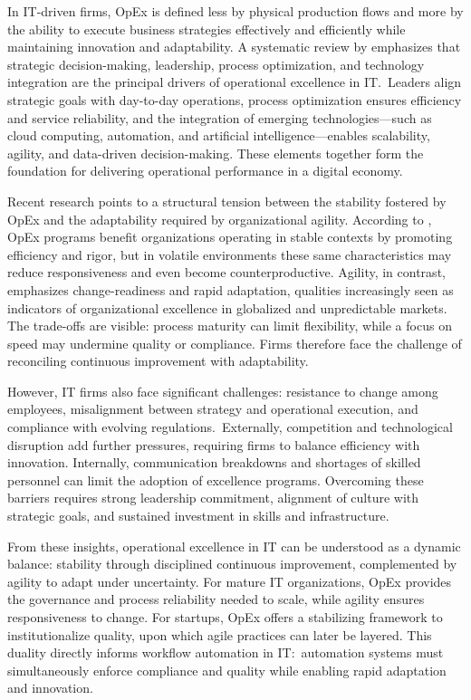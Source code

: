 In IT-driven firms, OpEx is defined less by physical production flows and more by the ability to execute business strategies effectively and efficiently while maintaining innovation and adaptability. A systematic review by \textcite{owoadeSystematic2024} emphasizes that strategic decision-making, leadership, process optimization, and technology integration are the principal drivers of operational excellence in IT.~Leaders align strategic goals with day-to-day operations, process optimization ensures efficiency and service reliability, and the integration of emerging technologies---such as cloud computing, automation, and artificial intelligence---enables scalability, agility, and data-driven decision-making. These elements together form the foundation for delivering operational performance in a digital economy.

Recent research points to a structural tension between the stability fostered by OpEx and the adaptability required by organizational agility. According to \textcite{carvalhoOperational2023}, OpEx programs benefit organizations operating in stable contexts by promoting efficiency and rigor, but in volatile environments these same characteristics may reduce responsiveness and even become counterproductive. Agility, in contrast, emphasizes change-readiness and rapid adaptation, qualities increasingly seen as indicators of organizational excellence in globalized and unpredictable markets. The trade-offs are visible: process maturity can limit flexibility, while a focus on speed may undermine quality or compliance. Firms therefore face the challenge of reconciling continuous improvement with adaptability.

However, IT firms also face significant challenges: resistance to change among employees, misalignment between strategy and operational execution, and compliance with evolving regulations.~Externally, competition and technological disruption add further pressures, requiring firms to balance efficiency with innovation. Internally, communication breakdowns and shortages of skilled personnel can limit the adoption of excellence programs. Overcoming these barriers requires strong leadership commitment, alignment of culture with strategic goals, and sustained investment in skills and infrastructure.

From these insights, operational excellence in IT can be understood as a dynamic balance: stability through disciplined continuous improvement, complemented by agility to adapt under uncertainty. For mature IT organizations, OpEx provides the governance and process reliability needed to scale, while agility ensures responsiveness to change. For startups, OpEx offers a stabilizing framework to institutionalize quality, upon which agile practices can later be layered. This duality directly informs workflow automation in IT:~automation systems must simultaneously enforce compliance and quality while enabling rapid adaptation and innovation.

